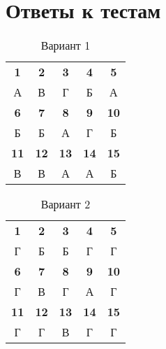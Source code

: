 \documentclass[12pt,a4paper]{article}
\begin{document}
\pagebreak

\section{Ответы к тестам}

\begin{table}[H]
  \centering
  \caption{Вариант 1}
    \begin{tabular}{ccccc}
    \toprule
    \textbf{1} & \textbf{2} & \textbf{3} & \textbf{4} & \textbf{5} \\
    А     & В     & Г     & Б     & А \\
    \midrule
    \textbf{6} & \textbf{7} & \textbf{8} & \textbf{9} & \textbf{10} \\
    Б     & Б     & А     & Г     & Б \\
    \midrule
    \textbf{11} & \textbf{12} & \textbf{13} & \textbf{14} & \textbf{15} \\
    В     & В     & А     & А     & Б \\
    \bottomrule
    \end{tabular}%
  \label{tab:addlabel}%
\end{table}%

\begin{table}[H]
  \centering
  \caption{Вариант 2}
    \begin{tabular}{ccccc}
    \toprule
    \textbf{1} & \textbf{2} & \textbf{3} & \textbf{4} & \textbf{5} \\
    Г     & Б     & Б     & Г     & Г \\
    \midrule
    \textbf{6} & \textbf{7} & \textbf{8} & \textbf{9} & \textbf{10} \\
    Г     & В     & Г     & А     & Г \\
    \midrule
    \textbf{11} & \textbf{12} & \textbf{13} & \textbf{14} & \textbf{15} \\
    Г     & Г     & В     & Г     & Г \\
    \bottomrule
    \end{tabular}%
  \label{tab:addlabel}%
\end{table}%
\end{document}
